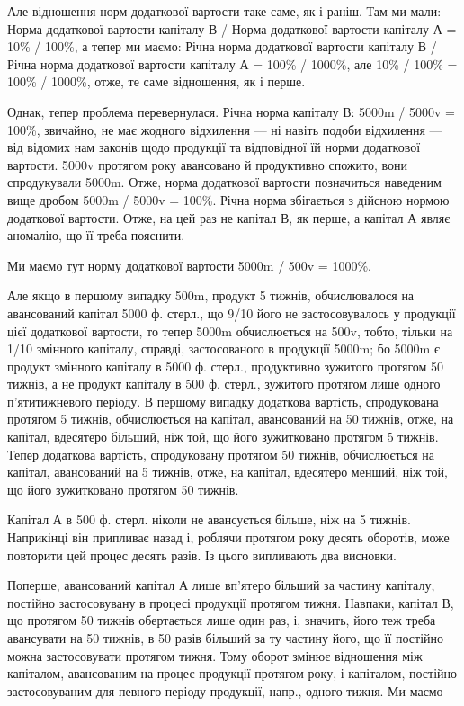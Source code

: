 \parcont{}  %
Але відношення норм додаткової вартости таке саме, як і раніш. Там ми мали:
Норма додаткової вартости капіталу В / Норма додаткової вартости капіталу А =
10\% / 100\%, а тепер ми маємо:
Річна норма додаткової вартости капіталу В / Річна норма додаткової вартости капіталу А = 100\% /
1000\%, але 10\% / 100\% = 100\% / 1000\%, отже, те саме відношення, як і перше.

Однак, тепер проблема перевернулася. Річна норма капіталу В:
5000m / 5000v = 100\%, звичайно, не має жодного відхилення — ні навіть
подоби відхилення — від відомих нам законів щодо продукції та відповідної
їй норми додаткової вартости. 5000v протягом року авансовано й
продуктивно спожито, вони спродукували 5000m. Отже, норма додаткової
вартости позначиться наведеним вище дробом 5000m / 5000v = 100\%. Річна
норма збігається з дійсною нормою додаткової вартости. Отже, на цей
раз не капітал В, як перше, а капітал А являє аномалію, що її треба
пояснити.

Ми маємо тут норму додаткової вартости 5000m / 500v = 1000\%.

Але якщо в першому випадку 500m, продукт 5 тижнів, обчислювалося
на авансований капітал 5000 ф. стерл., що 9/10 його не застосовувалось
у продукції цієї додаткової вартости, то тепер 5000m обчислюється на 500v,
тобто, тільки на 1/10 змінного капіталу, справді, застосованого в продукції
5000m; бо 5000m є продукт змінного капіталу в 5000 ф. стерл., продуктивно
зужитого протягом 50 тижнів, а не продукт капіталу в 500 ф. стерл.,
зужитого протягом лише одного п’ятитижневого періоду. В першому випадку
додаткова вартість, спродукована протягом 5 тижнів, обчислюється
на капітал, авансований на 50 тижнів, отже, на капітал, вдесятеро більший,
ніж той, що його зужитковано протягом 5 тижнів. Тепер додаткова вартість,
спродуковану протягом 50 тижнів, обчислюється на капітал, авансований
на 5 тижнів, отже, на капітал, вдесятеро менший, ніж той, що
його зужитковано протягом 50 тижнів.

Капітал А в 500 ф. стерл. ніколи не авансується більше, ніж на 5 тижнів.
Наприкінці він припливає назад і, роблячи протягом року десять
оборотів, може повторити цей процес десять разів. Із цього випливають
два висновки.

Поперше, авансований капітал А лише вп’ятеро більший за частину
капіталу, постійно застосовувану в процесі продукції протягом
тижня. Навпаки, капітал В, що протягом 50 тижнів обертається лише
один раз, і, значить, його теж треба авансувати на 50 тижнів, в 50 разів
більший за ту частину його, що її постійно можна застосовувати протягом
тижня. Тому оборот змінює відношення між капіталом, авансованим
на процес продукції протягом року, і капіталом, постійно застосовуваним
для певного періоду продукції, напр., одного тижня. Ми маємо
\parbreak{}  %
